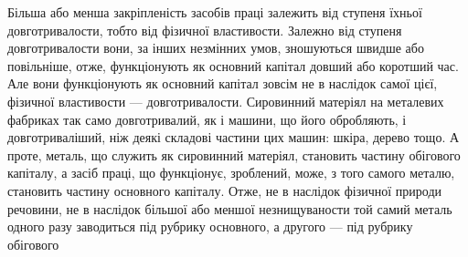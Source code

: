 Більша або менша закріпленість засобів праці залежить від ступеня
їхньої довготривалости, тобто від фізичної властивости. Залежно від
ступеня довготривалости вони, за інших незмінних умов, зношуються
швидше або повільніше, отже, функціонують як основний капітал довший
або коротший час. Але вони функціонують як основний капітал зовсім
не в наслідок самої цієї, фізичної властивости — довготривалости. Сировинний
матеріял на металевих фабриках так само довготривалий, як і машини,
що його обробляють, і довготриваліший, ніж деякі складові частини цих
машин: шкіра, дерево тощо. А проте, металь, що служить як сировинний
матеріял, становить частину обігового капіталу, а засіб праці, що функціонує,
зроблений, може, з того самого металю, становить частину основного
капіталу. Отже, не в наслідок фізичної природи речовини, не
в наслідок більшої або меншої незнищуваности той самий металь одного
разу заводиться під рубрику основного, а другого — під рубрику обігового
\parbreak{}  %
